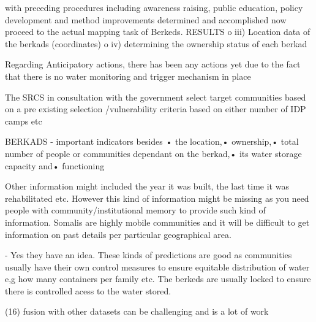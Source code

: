 with preceding procedures including awareness raising, public education, policy development and method improvements determined and accomplished now proceed to the actual mapping task of Berkeds.
RESULTS
o	iii) Location data of the berkads (coordinates)
o	iv) determining the ownership status of each berkad





Regarding Anticipatory actions, there has been any actions yet due to the fact that there is no water monitoring and trigger mechanism in place %

The SRCS in consultation with the government select target communities based on a pre existing selection /vulnerability criteria based on either number of IDP camps etc

BERKADS - important indicators besides •	the location,•	ownership,•	total number of people or communities dependant on the berkad,•	its water storage capacity and•	functioning

Other information might included the year it was built, the last time it was rehabilitated etc. However this kind of information might be missing as you need people with community/institutional memory to provide such kind of information. Somalis are highly mobile communities and it will be difficult to get information on past details per particular geographical area.


-	Yes they have an idea. These kinds of predictions are good as communities usually have their own control measures to ensure equitable distribution of water e,g how many containers per family etc. The berkeds are usually locked to ensure there is controlled acess to the water stored.






(16) fusion with other datasets can be challenging and is a lot of work










